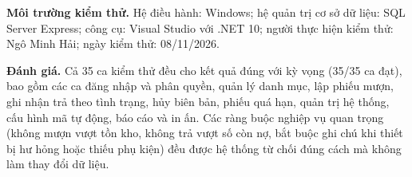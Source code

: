 \textbf{Môi trường kiểm thử.} Hệ điều hành: Windows; hệ quản trị cơ sở dữ liệu: SQL Server Express; công cụ: Visual Studio với .NET 10; người thực hiện kiểm thử: Ngô Minh Hải; ngày kiểm thử: 08/11/2026.

\textbf{Đánh giá.} Cả 35 ca kiểm thử đều cho kết quả đúng với kỳ vọng (35/35 ca đạt), bao gồm các ca đăng nhập và phân quyền, quản lý danh mục, lập phiếu mượn, ghi nhận trả theo tình trạng, hủy biên bản, phiếu quá hạn, quản trị hệ thống, cấu hình mã tự động, báo cáo và in ấn. Các ràng buộc nghiệp vụ quan trọng (không mượn vượt tồn kho, không trả vượt số còn nợ, bắt buộc ghi chú khi thiết bị hư hỏng hoặc thiếu phụ kiện) đều được hệ thống từ chối đúng cách mà không làm thay đổi dữ liệu.
